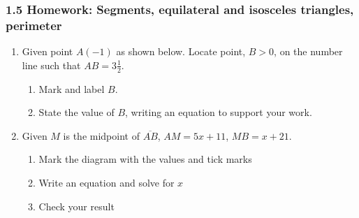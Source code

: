 

\fancyhead[LE]{\thepage}



\subsubsection*{1.5 Homework: Segments, equilateral and isosceles triangles, perimeter}
\begin{enumerate}
\item Given point $A(-1)$ as shown below. Locate point, $B > 0$, on the number line such that ${AB}=3 \frac{1}{2}$. \\[1.5cm]
    \begin{enumerate}
      \item Mark and label $B$.
      \item State the value of $B$, writing an equation to support your work.
    \end{enumerate} \vspace{3cm}  

\item Given $M$ is the midpoint of $\overline{AB}$, $AM=5x+11$, $MB=x+21$.
  \begin{enumerate}
    \item Mark the diagram with the values and tick marks
    \item Write an equation and solve for $x$
    \item Check your result
  \end{enumerate} \vspace{1cm}
    \begin{center}
    \end{center} \vspace{4cm}


\end{enumerate}
